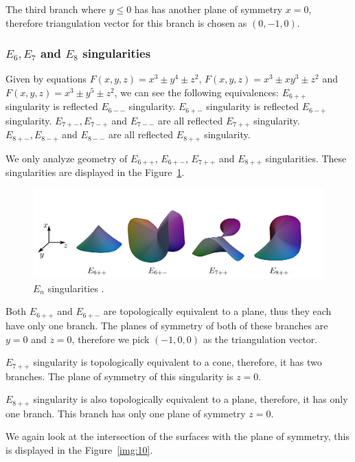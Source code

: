 The third branch where $y\leq0$ has has another plane of symmetry $x=0$,
therefore triangulation vector for this branch is chosen as $(0, -1, 0)$.

\subsubsection*{$E_6, E_7$ and $E_8$ singularities}

Given by equations $F(x,y,z)=x^3\pm y^4\pm z^2$, $F(x,y,z)=x^3\pm xy^3\pm z^2$
and $F(x,y,z)=x^3\pm y^5\pm z^2$, we can see the following equivalences:
$E_{6++}$ singularity is reflected $E_{6--}$ singularity.
$E_{6+-}$ singularity is reflected $E_{6-+}$ singularity.
$E_{7+-}, E_{7-+}$ and $E_{7--}$ are all reflected $E_{7++}$ singularity.
$E_{8+-}, E_{8-+}$ and $E_{8--}$ are all reflected $E_{8++}$ singularity.

We only analyze geometry of $E_{6++}$, $E_{6+-}$, $E_{7++}$ and $E_{8++}$
singularities. These singularities are displayed in the Figure~\ref{img:12}.


\begin{figure}
    \centerline{\includegraphics[scale=0.5]{images/img12}}
    \caption[$E_n$ singularities.]
    {$E_n$ singularities \cite{morris2003client}.}
    \label{img:12}
\end{figure}
Both $E_{6++}$ and $E_{6+-}$ are topologically equivalent to a plane, thus
they each have only one branch. The planes of symmetry of both of these 
branches are $y=0$ and $z=0$, therefore we pick $(-1, 0, 0)$ as the
triangulation vector.

$E_{7++}$ singularity is topologically equivalent to a cone, therefore, it has
two branches. The plane of symmetry of this singularity is $z=0$.

$E_{8++}$ singularity is also topologically equivalent to a plane, therefore,
it has only one branch. This branch has only one plane of symmetry $z=0$.

We again look at the intersection of the surfaces with the plane of 
symmetry, this is displayed in the Figure~\ref{img:10}.


